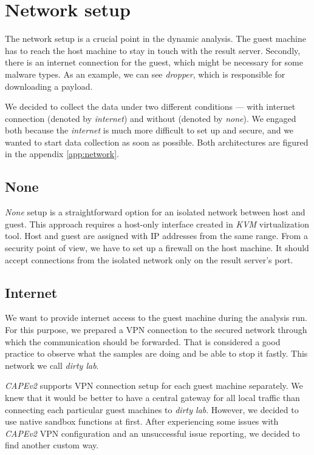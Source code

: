 \section{Network setup}
The network setup is a crucial point in the dynamic analysis. The guest machine has to reach the host machine to stay in touch with the result server. Secondly, there is an internet connection for the guest, which might be necessary for some malware types. As an example, we can see \emph{dropper}, which is responsible for downloading a payload.

We decided to collect the data under two different conditions --- with internet connection (denoted by \emph{internet}) and without (denoted by \emph{none}). We engaged both because the \emph{internet} is much more difficult to set up and secure, and we wanted to start data collection as soon as possible. Both architectures are figured in the appendix \ref{app:network}.

\subsection{None}
\emph{None} setup is a straightforward option for an isolated network between host and guest. This approach requires a host-only interface created in \emph{KVM} virtualization tool. Host and guest are assigned with IP addresses from the same range. From a security point of view, we have to set up a firewall on the host machine. It should accept connections from the isolated network only on the result server's port.

\subsection{Internet}
We want to provide internet access to the guest machine during the analysis run. For this purpose, we prepared a VPN connection to the secured network through which the communication should be forwarded. That is considered a good practice to observe what the samples are doing and be able to stop it fastly. This network we call \emph{dirty lab}.

\emph{CAPEv2} supports VPN connection setup for each guest machine separately. We knew that it would be better to have a central gateway for all local traffic than connecting each particular guest machines to \emph{dirty lab}. However, we decided to use native sandbox functions at first. After experiencing some issues with \emph{CAPEv2} VPN configuration and an unsuccessful issue reporting, we decided to find another custom way. 

